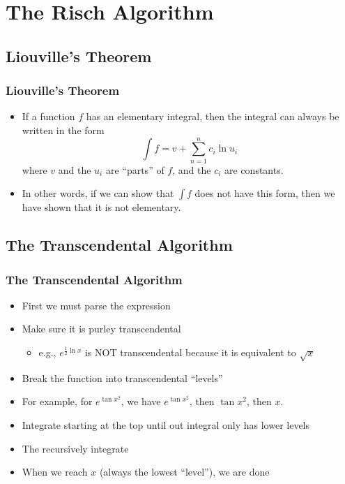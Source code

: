 \documentclass{beamer}
\numberwithin{equation}{section} %
\begin{document}
\section{The Risch Algorithm}

\subsection{Liouville's Theorem}

\begin{frame}
    \frametitle{Liouville's Theorem}
    \begin{itemize}
        \item If a function $f$ has an elementary integral, then the
        integral can always be written in the form
        \begin{equation}
            \label{liouville's theorem}
            \int{f} = v + \sum_{n=1}^n{c_i\ln{u_i}}
        \end{equation}
        where $v$ and the $u_i$ are ``parts'' of $f$, and the $c_i$ are
        constants.
        \pause
        \item In other words, if we can show that $\int{f}$ does not
        have this form, then we have shown that it is not elementary.
    \end{itemize}
\end{frame}

\subsection{The Transcendental Algorithm}

\begin{frame}
    \frametitle{The Transcendental Algorithm}
    \begin{itemize}
        \item First we must parse the expression
        \item Make sure it is purley transcendental
        \begin{itemize}
            \item e.g., $e^{\frac{1}{2}\ln{x}}$ is NOT transcendental
            because it is equivalent to $\sqrt{x}$
        \end{itemize}
    \pause
    \item Break the function into transcendental ``levels''
    \item For example, for $e^{\tan{x^2}}$, we have $e^{\tan{x^2}}$,
    then $\tan{x^2}$, then $x$.
    \pause
    \item Integrate starting at the top until out integral only has
    lower levels
    \item The recursively integrate
    \item When we reach $x$ (always the lowest ``level''), we are done
    \end{itemize}
\end{frame}
\end{document}

